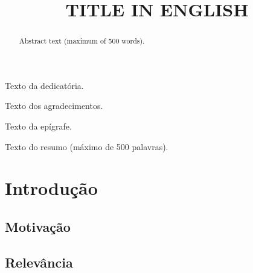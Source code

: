 \documentclass[openright]{normas-utf-tex} %
\title{\MakeUppercase{Title in English}} %
\begin{document}
\capa %
\folhaderosto %

\fichacatpgbib{\pageref{bibstart}-\pageref{bibend}}
\fichacat



\begin{dedicatoria}
Texto da dedicat\'oria.
\end{dedicatoria}

\begin{agradecimentos}
Texto dos agradecimentos.
\end{agradecimentos}

\begin{epigrafe}
Texto da ep\'igrafe.
\end{epigrafe}

\begin{resumo}
Texto do resumo (m\'aximo de 500 palavras).
\end{resumo}

\begin{abstract}
Abstract text (maximum of 500 words).
\end{abstract}

\listadefiguras %
\listadetabelas %
\listadequadros %
\listadesiglas %
\listadesimbolos %

\sumario %

\setcounter{page}{12}
\chapter{Introdução}
	
	\section{Motivação}	\label{motivation}
		
	\section{Relevância} \label{relevance}
		
\end{document}
